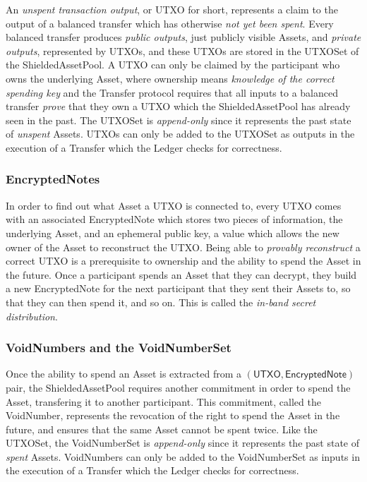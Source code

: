 \documentclass[a4paper]{article}
\newcommand{\lsubsubsection}[2]{\def\sectionlabel{#2} \subsubsection{#1}\label{sec:#2}}
\theoremstyle{definition}
\newcommand{\Asset}{{\textsf{Asset}}}
\newcommand{\EncryptedNote}{{\textsf{EncryptedNote}}}
\newcommand{\Ledger}{{\textsf{Ledger}}}
\newcommand{\ShieldedAssetPool}{{\textsf{ShieldedAssetPool}}}
\newcommand{\Transfer}{{\textsf{Transfer}}}
\newcommand{\UTXOSet}{{\textsf{UTXOSet}}}
\newcommand{\UTXO}{{\textsf{UTXO}}}
\newcommand{\VoidNumberSet}{{\textsf{VoidNumberSet}}}
\newcommand{\VoidNumber}{{\textsf{VoidNumber}}}
\begin{document}
An \emph{unspent transaction output}, or \UTXO{} for short, represents a claim to the output of a balanced transfer which has otherwise \emph{not yet been spent}. Every balanced transfer produces \emph{public outputs}, just publicly visible \Asset{s}, and \emph{private outputs}, represented by \UTXO{s}, and these \UTXO{s} are stored in the \UTXOSet{} of the \ShieldedAssetPool{}. A \UTXO{} can only be claimed by the participant who owns the underlying \Asset{}, where ownership means \emph{knowledge of the correct spending key} and the \Transfer{} protocol requires that all inputs to a balanced transfer \emph{prove} that they own a \UTXO{} which the \ShieldedAssetPool{} has already seen in the past. The \UTXOSet{} is \emph{append-only} since it represents the past state of \emph{unspent} \Asset{s}. \UTXO{s} can only be added to the \UTXOSet{} as outputs in the execution of a \Transfer{} which the \Ledger{} checks for correctness.

\lsubsubsection{\EncryptedNote{s}}{ledger-encrypted-notes}

In order to find out what \Asset{} a \UTXO{} is connected to, every \UTXO{} comes with an associated \EncryptedNote{} which stores two pieces of information, the underlying \Asset{}, and an ephemeral public key, a value which allows the new owner of the \Asset{} to reconstruct the \UTXO{}. Being able to \emph{provably reconstruct} a correct \UTXO{} is a prerequisite to ownership and the ability to spend the \Asset{} in the future. Once a participant spends an \Asset{} that they can decrypt, they build a new \EncryptedNote{} for the next participant that they sent their \Asset{s} to, so that they can then spend it, and so on. This is called the \emph{in-band secret distribution}.

\lsubsubsection{\VoidNumber{s} and the \VoidNumberSet{}}{ledger-void-number-set}

Once the ability to spend an \Asset{} is extracted from a $(\UTXO, \EncryptedNote)$ pair, the \ShieldedAssetPool{} requires another commitment in order to spend the \Asset{}, transfering it to another participant. This commitment, called the \VoidNumber{}, represents the revocation of the right to spend the \Asset{} in the future, and ensures that the same \Asset{} cannot be spent twice. Like the \UTXOSet{}, the \VoidNumberSet{} is \emph{append-only} since it represents the past state of \emph{spent} \Asset{s}. \VoidNumber{s} can only be added to the \VoidNumberSet{} as inputs in the execution of a \Transfer{} which the \Ledger{} checks for correctness.
\end{document}

